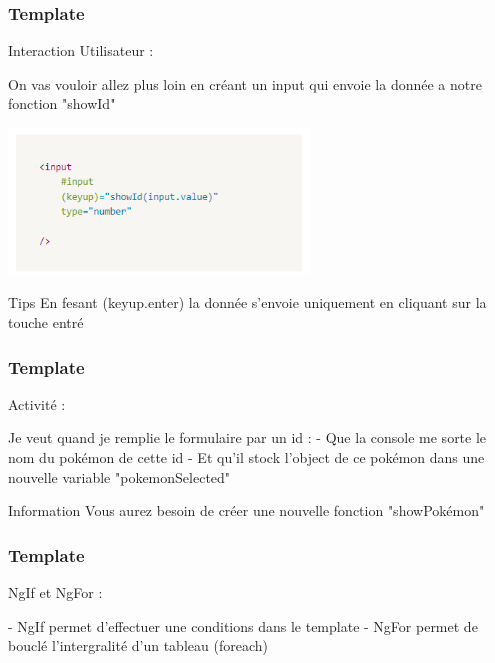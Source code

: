 \documentclass[10pt]{beamer}
\begin{document}
	\begin{frame}
		\frametitle{Template}

		Interaction Utilisateur : \newline \newline

		On vas vouloir allez plus loin en créant un input qui envoie la donnée a notre fonction "showId" \newline

		\centering
		\includegraphics[width=8cm]{assets/input} \newline

		\begin{block}{Tips}
			En fesant (keyup.enter) la donnée s'envoie uniquement en cliquant sur la touche entré
		\end{block}

	\end{frame}

	\begin{frame}
		\frametitle{Template}

		Activité : \newline \newline

		Je veut quand je remplie le formulaire par un id : \newline
		- Que la console me sorte le nom du pokémon de cette id\newline
		- Et qu'il stock l'object de ce pokémon dans une nouvelle variable "pokemonSelected" \newline \newline

		\begin{block}{Information}
			Vous aurez besoin de créer une nouvelle fonction "showPokémon"
		\end{block}


	\end{frame}

	\begin{frame}
		\frametitle{Template}

		NgIf et NgFor : \newline \newline

		- NgIf permet d'effectuer une conditions dans le template \newline
		- NgFor permet de bouclé l'intergralité d'un tableau (foreach) \newline


	\end{frame}
\end{document}
